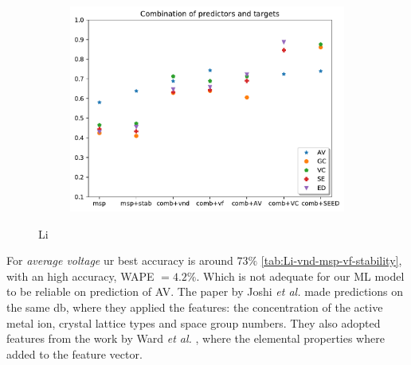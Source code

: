 \begin{figure}[h]
    \centering
  \begin{subfigure}{1\textwidth}
        \centering
        \includegraphics[width=\linewidth]{result/figures/comboofpred.pdf}
    \end{subfigure}%
        \caption{Li}
        \label{fig:predontarg_Li_last}
\end{figure}


For \textit{average voltage} ur best accuracy is around $73\%$ \ref{tab:Li-vnd-msp-vf-stability}, with an high accuracy, WAPE $= 4.2\%$. Which is not adequate for our ML model to be reliable on prediction of AV. The paper by Joshi \textit{et al.} \cite{joshi2019machine} made predictions on the same db, where they applied the features: the concentration of the active metal ion, crystal lattice types and space group numbers. They also adopted features from the work by Ward \textit{et al.} \cite{ward2016general}, where the elemental properties where added to the feature vector. 




